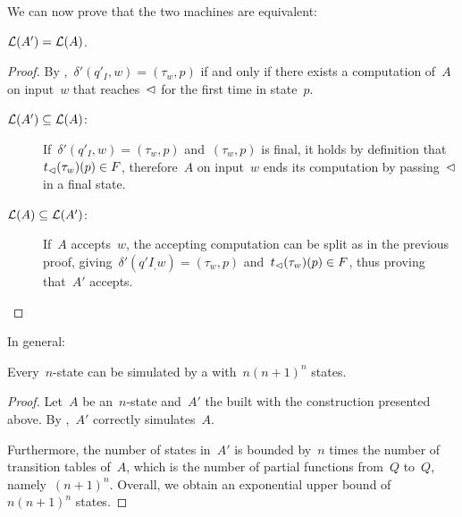 We can now prove that the two machines are equivalent:
\begin{thrm}\label{thm:transtab2DFA}
	$\mathcal L(A')=\mathcal L(A)$.
\end{thrm}
\begin{proof}
	By ,~$\delta'(q'_I,w)=(\tau_w,p)$ if and only if there exists a computation of~$A$ on input~$w$ that reaches~$\lhd$ for the first time in state~$p$.
	\begin{description}
		\item[$\mathcal L(A')\subseteq\mathcal L(A)$:] If~$\delta'(q'_I,w)=(\tau_w,p)$ and~$(\tau_w,p)$ is final, it holds by definition that~$t_\lhd(\tau_w)(p)\in F$, therefore~$A$ on input~$w$ ends its computation by passing~$\lhd$ in a final state.
		\item[$\mathcal L(A)\subseteq\mathcal L(A')$:] If~$A$ accepts~$w$, the accepting computation can be split as in the previous proof, giving~$\delta'(q'I_,w)=(\tau_w,p)$ and~$t_\lhd(\tau_w)(p)\in F$, thus proving that~$A'$ accepts. \qedhere
	\end{description}
\end{proof}

In general:
\begin{thrm}
	Every~$n$-state \TDFA can be simulated by a \ODFA with~$n(n+1)^n$ states.
\end{thrm}
\begin{proof}
	Let~$A$ be an~$n$-state \TDFA and~$A'$ the \ODFA built with the construction presented above.
	By ,~$A'$ correctly simulates~$A$.

	Furthermore, the number of states in~$A'$ is bounded by~$n$ times the number of transition tables of~$A$, which is the number of partial functions from~$Q$ to~$Q$, namely~$(n+1)^n$.
	Overall, we obtain an exponential upper bound of~$n(n+1)^n$ states.
\end{proof}
